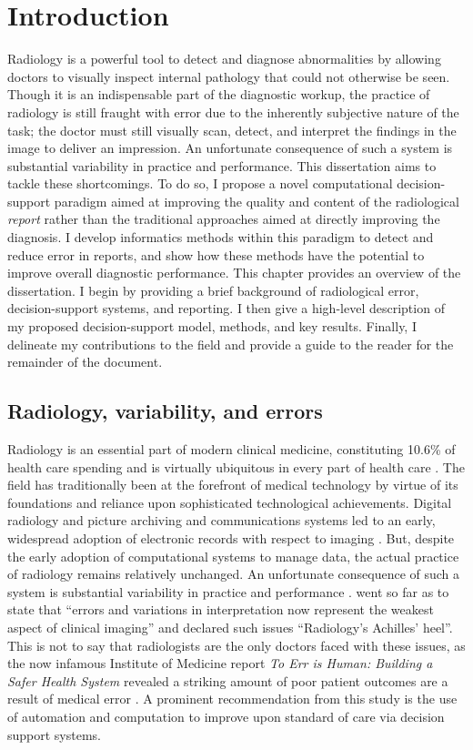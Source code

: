 \chapter{Introduction}
Radiology is a powerful tool to detect and diagnose abnormalities by allowing doctors to visually inspect internal pathology that could not otherwise be seen. Though it is an indispensable part of the diagnostic workup, the practice of radiology is still fraught with error due to the inherently subjective nature of the task; the doctor must still visually scan, detect, and interpret the findings in the image to deliver an impression. An unfortunate consequence of such a system is substantial variability in practice and performance. This dissertation aims to tackle these shortcomings. To do so, I propose a novel computational decision-support paradigm aimed at improving the quality and content of the radiological \emph{report} rather than the traditional approaches aimed at directly improving the diagnosis. I develop informatics methods within this paradigm to detect and reduce error in reports, and show how these methods have the potential to improve overall diagnostic performance. This chapter provides an overview of the dissertation. I begin by providing a brief background of radiological error, decision-support systems, and reporting. I then give a high-level description of my proposed decision-support model, methods, and key results. Finally, I delineate my contributions to the field and provide a guide to the reader for the remainder of the document.

\section{Radiology, variability, and errors}
Radiology is an essential part of modern clinical medicine, constituting 10.6\% of health care spending and is virtually ubiquitous in every part of health care \cite{Dodoo:tg}. The field has traditionally been at the forefront of medical technology by virtue of its foundations and reliance upon sophisticated technological achievements. Digital radiology and picture archiving and communications systems led to an early, widespread adoption of electronic records with respect to imaging \cite{Strickland:2000cv,Bryan:1999kn}. But, despite the early adoption of computational systems to manage data, the actual practice of radiology remains relatively unchanged. An unfortunate consequence of such a system is substantial variability in practice and performance \cite{Fitzgerald:2001hn}.  went so far as to state that ``errors and variations in interpretation now represent the weakest aspect of clinical imaging'' and declared such issues ``Radiology's Achilles' heel''. This is not to say that radiologists are the only doctors faced with these issues, as the now infamous Institute of Medicine report \emph{To Err is Human: Building a Safer Health System} revealed a striking amount of poor patient outcomes are a result of medical error \cite{Anonymous:2000va}. A prominent recommendation from this study is the use of automation and computation to improve upon standard of care via decision support systems.

